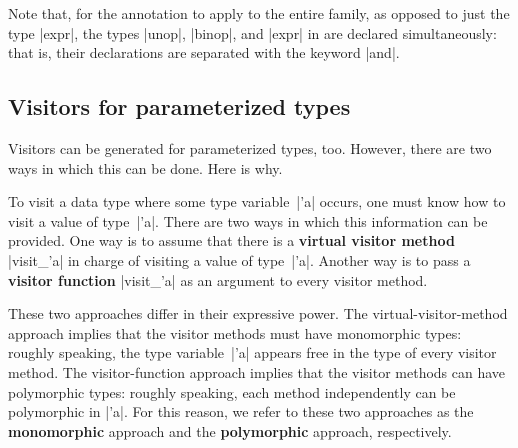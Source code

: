 \documentclass[11pt,a4paper,twoside]{article}
\renewcommand{\emph}[1]{\textbf{#1}}
\begin{document}
Note that, for the \derivingvisitors annotation to apply to the entire family,
as opposed to just the type \oc|expr|, the types \oc|unop|, \oc|binop|, and
\oc|expr| in  are declared simultaneously: that is, their
declarations are separated with the keyword \oc|and|.


\subsection{Visitors for parameterized types}
\label{sec:intro:parameterized}


Visitors can be generated for parameterized types, too. However, there are two
ways in which this can be done. Here is why.

To visit a data type where some type variable~\oc|'a| occurs, one must know
how to visit a value of type~\oc|'a|.
%
%
There are two ways in which this information can be provided. One way is to
assume that there is a \emph{virtual visitor method} \oc|visit_'a| in charge
of visiting a value of type~\oc|'a|. Another way is to pass a \emph{visitor
  function} \oc|visit_'a| as an argument to every visitor method.


These two approaches differ in their expressive power. The
virtual-visitor-method approach implies that the visitor methods must have
monomorphic types: roughly speaking, the type variable~\oc|'a|
appears free in the type of every visitor method.
The visitor-function approach implies that the visitor methods can have
polymorphic types: roughly speaking, each method independently
can be polymorphic in \oc|'a|.
For this reason, we refer to these two approaches as the \emph{monomorphic}
approach and the \emph{polymorphic} approach, respectively.
\end{document}
